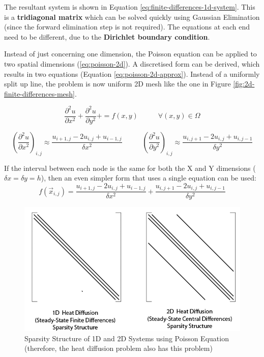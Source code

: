 \documentclass{article}
\begin{document}
The resultant system is shown in Equation \ref{eq:finite-differences-1d-system}. This is a \textbf{tridiagonal matrix} which can be solved quickly using Gaussian Elimination (since the forward elimination step is not required). The equations at each end need to be different, due to the \textbf{Dirichlet boundary condition}.

Instead of just concerning one dimension, the Poisson equation can be applied to two spatial dimensions (\ref{eq:poisson-2d}). A discretised form can be derived, which results in two equations (Equation \ref{eq:poisson-2d-approx}). Instead of a uniformly split up line, the problem is now uniform 2D mesh like the one in Figure \ref{fig:2d-finite-differences-mesh}.

\begin{equation}
	\frac{\partial^2 u}{\partial x^2} + \frac{\partial^2 u}{\partial y^2} +  = f(x, y)
	\;\;\;\;\;\;\;\;\;\; \forall (x, y) \in \Omega
	\label{eq:poisson-2d}
\end{equation}

\begin{equation}
	{\left( \frac{\partial^2 u}{\partial x^2} \right)}_{i,j} \approx \frac{u_{i + 1,j} - 2u_{i,j} + u_{i - 1,j} }{\delta x^2}
	\;\;\;\;\;\;\;\;\;\; 
	{\left( \frac{\partial^2 u}{\partial y^2} \right)}_{i,j} \approx \frac{u_{i,j+1} - 2u_{i,j} + u_{i,j-1} }{\delta y^2}	
	\label{eq:poisson-2d-approx}
\end{equation}

If the interval between each node is the same for both the X and Y dimensions ($\delta x = \delta y = h$), then an even simpler form that uses a single equation can be used:
\begin{equation}
	f(\vec{x}_{i,j}) = \frac{u_{i + 1,j} - 2u_{i,j} + u_{i - 1,j} }{\delta x^2} + \frac{u_{i,j+1} - 2u_{i,j} + u_{i,j-1} }{\delta y^2}	
	\label{eq:poisson-2d-approx-uniform}
\end{equation}

\begin{figure}
	\centering
	\includegraphics[scale=0.35]{figures/heat-diffusion-sparsity-structures.png}
	\caption{Sparsity Structure of 1D and 2D Systems using Poisson Equation (therefore, the heat diffusion problem also has this problem)}
	\label{fig:poisson-1d-and-2d-sparsity}
\end{figure}
\end{document}

